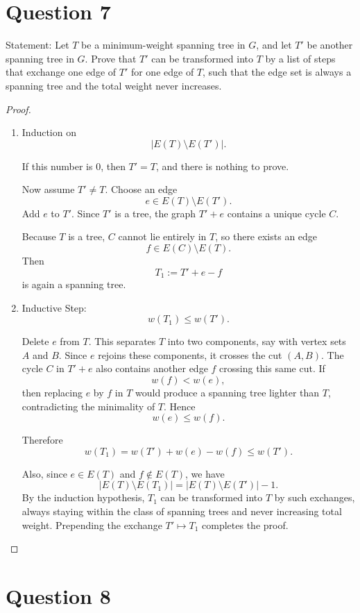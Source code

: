 \documentclass[11pt]{article}
\begin{document}
\newpage

\section*{Question 7}

Statement: {Let $T$ be a minimum-weight spanning tree in $G$, and let $T'$ be another spanning tree in $G$. Prove that $T'$ can be transformed into $T$ by a list of steps that exchange one edge of $T'$ for one edge of $T$, such that the edge set is always a spanning tree and the total weight never increases.}

\begin{proof}
~
\begin{enumerate}
    \item Induction on
\[
|E(T)\setminus E(T')|.
\]

If this number is $0$, then $T'=T$, and there is nothing to prove.

Now assume $T'\neq T$. Choose an edge
\[
e\in E(T)\setminus E(T').
\]
Add $e$ to $T'$. Since $T'$ is a tree, the graph $T'+e$ contains a unique cycle $C$.

Because $T$ is a tree, $C$ cannot lie entirely in $T$, so there exists an edge
\[
f\in E(C)\setminus E(T).
\]
Then
\[
T_1:=T'+e-f
\]
is again a spanning tree.

\item Inductive Step:
\[
w(T_1)\le w(T').
\]

Delete $e$ from $T$. This separates $T$ into two components, say with vertex sets $A$ and $B$. Since $e$ rejoins these components, it crosses the cut $(A,B)$. The cycle $C$ in $T'+e$ also contains another edge $f$ crossing this same cut. If
\[
w(f)<w(e),
\]
then replacing $e$ by $f$ in $T$ would produce a spanning tree lighter than $T$, contradicting the minimality of $T$. Hence
\[
w(e)\le w(f).
\]

Therefore
\[
w(T_1)=w(T')+w(e)-w(f)\le w(T').
\]

Also, since $e\in E(T)$ and $f\notin E(T)$, we have
\[
|E(T)\setminus E(T_1)|=|E(T)\setminus E(T')|-1.
\]
By the induction hypothesis, $T_1$ can be transformed into $T$ by such exchanges, always staying within the class of spanning trees and never increasing total weight. Prepending the exchange $T'\mapsto T_1$ completes the proof.
\end{enumerate}
\end{proof}

\newpage

\section*{Question 8}
\end{document}
